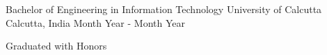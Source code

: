 

\begin{cventries}

  \cventry
    {Bachelor of Engineering in Information Technology} %
    {University of Calcutta} %
    {Calcutta, India} %
    {Month Year - Month Year} %
    {
      \begin{cvitems} %
        \item {Graduated with Honors}
      \end{cvitems}
    }

\end{cventries}

